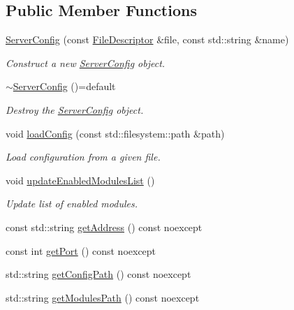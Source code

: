 \subsection*{Public Member Functions}
\begin{DoxyCompactItemize}
\item 
\hyperlink{class_zia_1_1_server_config_a1a98af732891f93c29f588b5377d4cb2}{Server\+Config} (const \hyperlink{namespacecfg_af0aed6e47bd26e91ad7d69467f96caaf}{File\+Descriptor} \&file, const std\+::string \&name)
\begin{DoxyCompactList}\small\item\em Construct a new \hyperlink{class_zia_1_1_server_config}{Server\+Config} object. \end{DoxyCompactList}\item 
\hyperlink{class_zia_1_1_server_config_aed6f704e1b0c3fa4b7abe44d7dcc3d06}{$\sim$\+Server\+Config} ()=default
\begin{DoxyCompactList}\small\item\em Destroy the \hyperlink{class_zia_1_1_server_config}{Server\+Config} object. \end{DoxyCompactList}\item 
void \hyperlink{class_zia_1_1_server_config_ad50ff700e0dd38f66017ce229f89717e}{load\+Config} (const std\+::filesystem\+::path \&path)
\begin{DoxyCompactList}\small\item\em Load configuration from a given file. \end{DoxyCompactList}\item 
void \hyperlink{class_zia_1_1_server_config_a4467dc6237876b82ad5970b2f6ee1966}{update\+Enabled\+Modules\+List} ()
\begin{DoxyCompactList}\small\item\em Update list of enabled modules. \end{DoxyCompactList}\item 
const std\+::string \hyperlink{class_zia_1_1_server_config_a0df081f26973e1a5182adf8f3d6495ae}{get\+Address} () const noexcept
\item 
const int \hyperlink{class_zia_1_1_server_config_ad8095c8981f48e9fa4112de41d4e6657}{get\+Port} () const noexcept
\item 
std\+::string \hyperlink{class_zia_1_1_server_config_aaa1d6beade9709ef602149c669641da9}{get\+Config\+Path} () const noexcept
\item 
std\+::string \hyperlink{class_zia_1_1_server_config_ae55e57b14d9efafcbecc23bf5b8d3957}{get\+Modules\+Path} () const noexcept

\end{DoxyCompactItemize}
